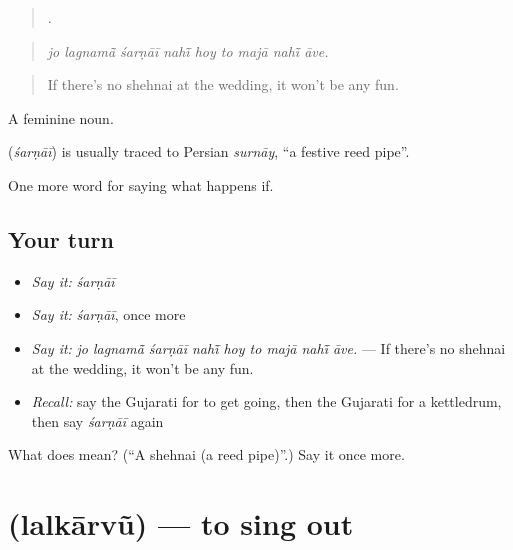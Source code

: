 \begin{quote}
        .
\end{quote}

\begin{quote}
\emph{jo lagnamā̃ śarṇāī nahī̃ hoy to majā nahī̃ āve.}
\end{quote}

\begin{quote}
If there's no shehnai at the wedding, it won't be any fun.
\end{quote}

A feminine noun.

\begin{cousinweb}
\textbf{} (\emph{śarṇāī}) is usually traced to Persian \emph{surnāy}, \textquotedblleft{}a festive reed pipe\textquotedblright{}.
\end{cousinweb}

\begin{grammarlens}[title={What you've built}]
One more word for saying what happens if.
\end{grammarlens}

\subsection*{Your turn}
\begin{itemize}
\raggedright
  \item \emph{Say it:} \emph{śarṇāī}
  \item \emph{Say it:} \emph{śarṇāī}, once more
  \item \emph{Say it:} \emph{jo lagnamā̃ śarṇāī nahī̃ hoy to majā nahī̃ āve.} — If there's no shehnai at the wedding, it won't be any fun.
  \item \emph{Recall:} say the Gujarati for to get going, then the Gujarati for a kettledrum, then say \emph{śarṇāī} again
\end{itemize}

\begin{tcolorbox}[breakable,colback=teal!4,colframe=teal!35!black,title={Before you move on}]
What does  mean? (\textquotedblleft{}A shehnai (a reed pipe)\textquotedblright{}.) Say it once more.
\end{tcolorbox}
\section[\texorpdfstring{\gu{લલકારવું} (lalkārvũ)}{લલકારવું (lalkārvũ)}]{ (lalkārvũ) — to sing out}

